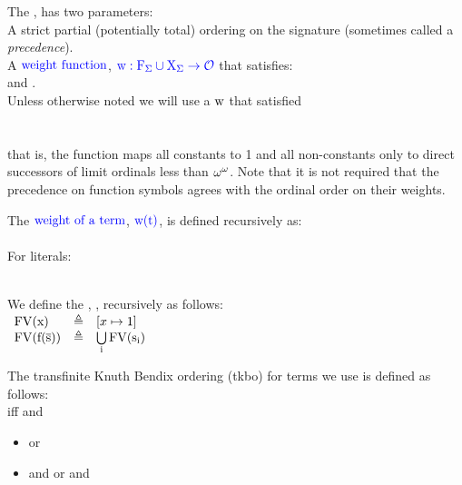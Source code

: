 \noindent
The ,  has two parameters:\\
A strict partial (potentially total) ordering \m{\succ} on the signature  (sometimes called a \emph{precedence}).\\
A $\textcolor{blue}{\mbox{weight function}}$, $\textcolor{blue}{\mathrm{w:F_\Sigma \cup X_\Sigma \rightarrow \mathcal{O}}}$ that satisfies:\\
 and  .\\
Unless otherwise noted we will use a $\mathrm{w}$ that satisfied\\
\\
\\
that is, the function maps all constants to 1 and all non-constants only to direct successors of limit ordinals less than $\mathrm{\omega^\omega}$. 
Note that it is not required that the precedence on function symbols agrees with the ordinal order on their weights.

\noindent
The $\textcolor{blue}{\mbox{weight of a term}}$, $\textcolor{blue}{\mathrm{w(t)}}$, is defined recursively as:\\
\\
For literals:\\
\\

\noindent
We define the  , , recursively as follows:\\
$ 
\begin{array}{lll}
	\mathrm{FV}(\mathrm{x})         & \triangleq & [x \mapsto 1]\\
	\mathrm{FV}(\mathrm{\mathrm{f}(\mathrm{\overline{s}})}) & \triangleq & \bigcup\limits_{\mathrm{i}} \mathrm{FV}(\mathrm{s_i})\\
\end{array} 
$

\bigskip

\noindent
The transfinite Knuth Bendix ordering (tkbo) for terms we use is defined as follows:\\
 iff  and
\begin{itemize}
	\item {} or
	\item {} and
		\subitem {} or
		\subitem {} and 
\end{itemize}


